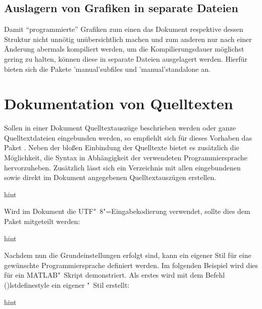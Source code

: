 \documentclass[%
  english,ngerman,%
  cdgeometry=no,DIV=12,%
  cd=false,cdfont=false,cdtitle=true,%
  headings=normal,%
  automark,%
  listof=toc,%
]{tudscrartcl}
\begin{document}
\subsection{Auslagern von Grafiken in separate Dateien}

Damit \enquote{programmierte} Grafiken zum einen das Dokument respektive dessen 
Struktur nicht unnötig unübersichtlich machen und zum anderen nur nach einer 
Änderung abermals kompiliert werden, um die Kompilierungsdauer möglichst gering 
zu halten, können diese in separate Dateien ausgelagert werden. Hierfür bieten 
sich die Pakete \Package'manual'{subfiles} und \Package'manual'{standalone} an.



\section{Dokumentation von Quelltexten}

Sollen in einer Dokument Quelltextauszüge beschrieben werden oder ganze 
Quelltextdateien eingebunden werden, so empfiehlt sich für dieses Vorhaben das 
Paket . Neben der bloßen Einbindung der Quelltexte bietet es 
zusätzlich die Möglichkeit, die Syntax in Abhängigkeit der verwendeten 
Programmiersprache hervorzuheben. Zusätzlich lässt sich ein Verzeichnis mit 
allen eingebundenen sowie direkt im Dokument angegebenen Quelltextauszügen 
erstellen.
%
\begin{Code}{hint}
\usepackage{listings}
\end{Code}

Wird im Dokument die UTF"~8"=Eingabekodierung verwendet, sollte dies dem Paket 
mitgeteilt werden:
%
\begin{Code}{hint}
\end{Code}

Nachdem nun die Grundeinstellungen erfolgt sind, kann ein eigener Stil für eine 
gewünschte Programmiersprache definiert werden. Im folgenden Beispiel wird dies 
für ein MATLAB"~Skript demonstriert. Als erstes wird mit dem Befehl 
\Macro(){lstdefinestyle} ein eigener "~Stil 
erstellt:
%
\begin{Code}[input]{hint}
\end{Code}
\end{document}
